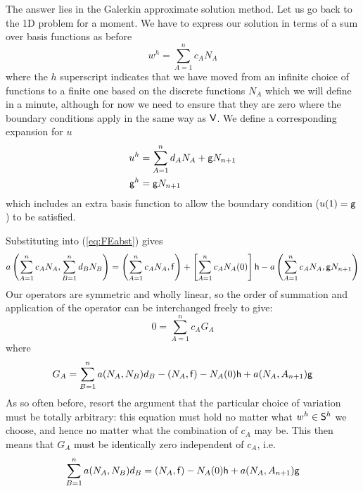 \documentclass[10pt]{article}
\newcommand{\curly}{\sf }
\begin{document}
	The answer lies in the Galerkin approximate solution method.
	Let us go back to the 1D problem for a moment.
	We have to express our solution in terms of a sum over basis functions as before
		\begin{equation}
				w^h = \sum_{A=1}^{n} c_A  N_A
		\end{equation}
	where the $h$ superscript indicates that we have moved from an infinite choice of
	functions to a finite one based on the discrete functions $N_A$ which we will define
	in a minute, although for now we need to ensure that they are zero where the boundary conditions apply
	in the same way as $\curly V$. We define a corresponding expansion for $u$
		\begin{equation}
			\begin{split}
				u^h &= \sum_{A=1}^{n} d_A  N_A + {\curly g}N_{n+1} \\
				{\curly g}^h &= {\curly g} N_{n+1}
			\end{split}
		\end{equation}	
	which includes an extra basis function to allow the boundary condition ($u(1)={\curly g}$) to be satisfied.
	
	Substituting into (\ref{eq:FEabst}) gives 
		\begin{equation}
			a\left( \sum_{A=1}^n c_A N_A , \sum_{B=1}^n d_B N_B \right) = 
			\left( \sum_{A=1}^n c_A N_A , {\curly f} \right) + \left[ \sum_{A=1}^n c_A N_A(0) \right] {\curly h}
			-a\left( \sum_{A=1}^n c_A N_A , {\curly g} N_{n+1} \right)
		\end{equation}
	Our operators are symmetric and wholly linear, so the order of summation and application
	of the operator can be interchanged freely to give:
		\begin{equation}
			0 = 	\sum_{A=1}^n c_A G_A
		\end{equation}
	where
		\begin{equation}
			G_A = \sum_{B=1}^n a(N_A,N_B)d_B - (N_A,{\curly f}) - N_A(0){\curly h} + a(N_A,A_{n+1}){\curly g}
		\end{equation}
	As so often before, resort the argument that the particular choice of variation must 
	be totally arbitrary: this equation must hold no matter what $w^h \in {\curly S}^h$ we choose, and
	hence no matter what the combination of $c_A$ may be.
	This then means that $G_A$ must be identically zero independent of $c_A$, i.e.
		\begin{equation}
			 \sum_{B=1}^n a(N_A,N_B)d_B =  (N_A,{\curly f} ) 
			 - N_A(0){\curly h} +
			  a(N_A,A_{n+1}) {\curly g}
			 \label{eq:gal2}
		\end{equation}
	
\end{document}
